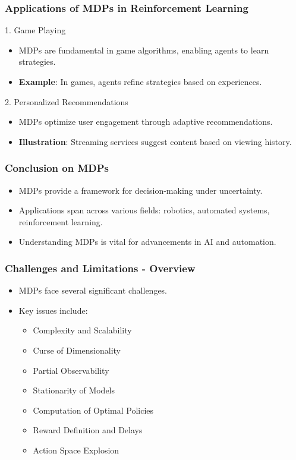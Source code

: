 \documentclass[aspectratio=169]{beamer}
\begin{document}
\begin{frame}[fragile]
    \frametitle{Applications of MDPs in Reinforcement Learning}
    \begin{block}{1. Game Playing}
        \begin{itemize}
            \item MDPs are fundamental in game algorithms, enabling agents to learn strategies.
            \item \textbf{Example}: In games, agents refine strategies based on experiences.
        \end{itemize}
    \end{block}

    \begin{block}{2. Personalized Recommendations}
        \begin{itemize}
            \item MDPs optimize user engagement through adaptive recommendations.
            \item \textbf{Illustration}: Streaming services suggest content based on viewing history.
        \end{itemize}
    \end{block}
\end{frame}

\begin{frame}[fragile]
    \frametitle{Conclusion on MDPs}
    \begin{itemize}
        \item MDPs provide a framework for decision-making under uncertainty.
        \item Applications span across various fields: robotics, automated systems, reinforcement learning.
        \item Understanding MDPs is vital for advancements in AI and automation.
    \end{itemize}
\end{frame}

\begin{frame}[fragile]
    \frametitle{Challenges and Limitations - Overview}
    \begin{itemize}
        \item MDPs face several significant challenges.
        \item Key issues include:
        \begin{itemize}
            \item Complexity and Scalability
            \item Curse of Dimensionality
            \item Partial Observability
            \item Stationarity of Models
            \item Computation of Optimal Policies
            \item Reward Definition and Delays
            \item Action Space Explosion
        \end{itemize}
    \end{itemize}
\end{frame}
\end{document}
